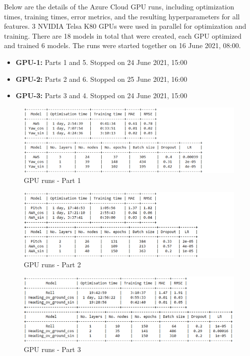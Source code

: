 
Below are the details of the Azure Cloud GPU runs, including optimization times, training times, error metrics, and the resulting hyperparameters for all features. 3 NVIDIA Telsa K80 GPUs were used in parallel for optimization and training. There are 18 models in total that were created, each GPU optimized and trained 6 models. The runs were started together on 16 June 2021, 08:00.

\medskip

\begin{itemize}
  \item \textbf{GPU-1:} Parts 1 and 5. Stopped on 24 June 2021, 15:00
  \item \textbf{GPU-2:} Parts 2 and 6. Stopped on 25 June 2021, 16:00
  \item \textbf{GPU-3:} Parts 3 and 4. Stopped on 24 June 2021, 15:00
\end{itemize}

\bigskip

\begin{figure}[h]
\centering
\includegraphics[width = \hsize]{figures/Contribution/gpu-runs/part1.png}
\caption{GPU runs - Part 1}
\end{figure}

\begin{figure}[h]
\centering
\includegraphics[width = \hsize]{figures/Contribution/gpu-runs/part2.png}
\caption{GPU runs - Part 2}
\end{figure}

\begin{figure}[h]
\centering
\includegraphics[width = \hsize]{figures/Contribution/gpu-runs/part3.png}
\caption{GPU runs - Part 3}
\end{figure}

